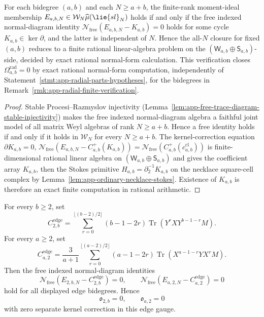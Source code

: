 \begin{prop}
\label{prop:app-radial-pr-unconditional-window}
  For each bidegree \((a,b)\) and each \(N\geq a+b\), the
  finite-rank moment-ideal membership
  \(E_{a,b,N}\in\mathcal W_N\widehat\mu(\lie{sl}_N)\) holds if and
  only if the free indexed normal-diagram identity
  \(\mathcal N_{\mathrm{free}}(E_{a,b,N}-K_{a,b})=0\) holds for some
  cycle \(K_{a,b}\in\ker\partial\), and the latter is independent of
  \(N\).  Hence the all-\(N\) closure for fixed \((a,b)\) reduces to a
  finite rational linear-algebra problem on the
  \((\mathsf W_{a,b}\oplus\mathsf S_{a,b})\)-side, decided by exact
  rational normal-form calculation.  This verification
  closes \(\Omega^{\mathrm{rad}}_{a,b}=0\) by exact rational
  normal-form computation, independently of
  Statement~\ref{stmt:app-radial-parts-hypotheses}, for the
  bidegrees in
  Remark~\ref{rmk:app-radial-finite-verification}.
\end{prop}

\begin{proof}
  Stable Procesi--Razmyslov injectivity
  (Lemma~\ref{lem:app-free-trace-diagram-stable-injectivity}) makes
  the free indexed normal-diagram algebra a faithful joint model
  of all matrix Weyl algebras of rank \(N\geq a+b\).  Hence a free
  identity holds if and only if it holds in \(\mathcal W_N\) for every
  \(N\geq a+b\).  The kernel-correction equation
  \(\partial K_{a,b}=0\),
  \(\mathcal N_{\mathrm{free}}(E_{a,b,N}-C^+_{a,b}(K_{a,b}))
    =\mathcal N_{\mathrm{free}}(C^+_{a,b}(c^{\mathrm{cl}}_{a,b}))\)
  is finite-dimensional rational linear algebra on
  \((\mathsf W_{a,b}\oplus\mathsf S_{a,b})\) and gives the coefficient
  array \(K_{a,b}\), then the Stokes primitive
  \(H_{a,b}=\partial_2^{-1}K_{a,b}\) on the necklace square-cell
  complex by Lemma~\ref{lem:app-ordinary-necklace-stokes}.  Existence
  of \(K_{a,b}\) is therefore an exact finite computation in rational
  arithmetic.
\end{proof}

\begin{prop}
\label{prop:app-edge-pbw-telescoping}
  For every \(b\geq2\), set
  \[
    C^{\mathrm{edge}}_{2,b}
    =
    \sum_{r=0}^{\lfloor(b-2)/2\rfloor}
      (b-1-2r)\operatorname{Tr}(Y^rXY^{b-1-r}M).
  \]
  For every \(a\geq2\), set
  \[
    C^{\mathrm{edge}}_{a,2}
    =
    \frac3{a+1}
    \sum_{r=0}^{\lfloor(a-2)/2\rfloor}
      (a-1-2r)\operatorname{Tr}(X^{a-1-r}YX^rM).
  \]
  Then the free indexed normal-diagram identities
  \[
    \mathcal N_{\mathrm{free}}
      (E_{2,b,N}-C^{\mathrm{edge}}_{2,b})=0,
    \qquad
    \mathcal N_{\mathrm{free}}
      (E_{a,2,N}-C^{\mathrm{edge}}_{a,2})=0
  \]
  hold for all displayed edge bidegrees.  Hence
  \[
    \mathfrak o_{2,b}=0,\qquad
    \mathfrak o_{a,2}=0
  \]
  with zero separate kernel correction in this edge gauge.
\end{prop}

